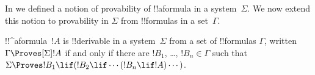 \documentclass[../../../include/open-logic-section]{subfiles}
\begin{document}

In  we defined a notion of provability
of !!a{formula} in a system~$\Sigma$. We now extend this notion to
provability in $\Sigma$ from !!{formula}s in a set~$\Gamma$.

\begin{defn}
  !!^a{formula}~$!A$ is !!{derivable} in a system~$\Sigma$ from a set of
  !!{formula}s $\Gamma$, written $\Gamma \Proves[\Sigma] !A$ if and
  only if there are $!B_1$, \dots, $!B_n \in \Gamma$ such that
  $\Sigma \Proves !B_1 \lif (!B_2 \lif \cdots (!B_n \lif !A)
  \cdots)$. 
\end{defn}
\end{document}
